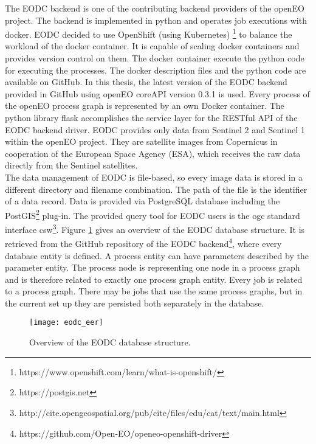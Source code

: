 \documentclass[draft,final]{vutinfth} %
\begin{document}
The EODC backend is one of the contributing backend providers of the openEO project. The backend is implemented in python and operates job executions with docker. EODC decided to use OpenShift (using Kubernetes) \footnote{https://www.openshift.com/learn/what-is-openshift/} to balance the workload of the docker container. It is capable of scaling docker containers and provides version control on them. The docker container execute the python code for executing the processes. The docker description files and the python code are available on GitHub. In this thesis, the latest version of the EODC backend provided in GitHub using openEO coreAPI version 0.3.1 is used. Every process of the openEO process graph is represented by an own Docker container. The python library flask accomplishes the service layer for the RESTful API of the EODC backend driver. EODC provides only data from Sentinel 2 and Sentinel 1 within the openEO project. They are satellite images from Copernicus in cooperation of the European Space Agency (ESA), which receives the raw data directly from the Sentinel satellites. \\
The data management of EODC is file-based, so every image data is stored in a different directory and filename combination. The path of the file is the identifier of a data record. Data is provided via PostgreSQL database including the PostGIS\footnote{https://postgis.net} plug-in. The provided query tool for EODC users is the \gls{ogc} standard interface \gls{csw}\footnote{http://cite.opengeospatial.org/pub/cite/files/edu/cat/text/main.html}. Figure \ref{fig:eodceer} gives an overview of the EODC database structure. It is retrieved from the GitHub repository of the EODC backend\footnote{https://github.com/Open-EO/openeo-openshift-driver}, where every database entity is defined. A process entity can have parameters described by the parameter entity. The process node is representing one node in a process graph and is therefore related to exactly one process graph entity. Every job is related to a process graph. There may be jobs that use the same process graphs, but in the current set up they are persisted both separately in the database.

\begin{figure}[h]
	\centering
	\texttt{[image: eodc\_eer]}
	\caption{Overview of the EODC database structure.}
	\label{fig:eodceer} %
\end{figure}
\end{document}
